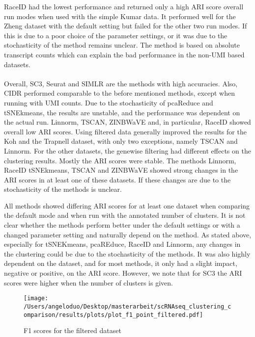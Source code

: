 \documentclass[12pt, a4paper]{article}\usepackage[]{graphicx}\usepackage[]{color}
\begin{document}
RaceID had the lowest performance and returned only a high ARI score overall run modes when used with the simple Kumar data. It performed well for the Zheng dataset with the default setting but failed for the other two run modes. If this is due to a poor choice of the parameter settings, or it was due to the stochasticity of the method remains unclear. The method is based on absolute transcript counts which can explain the bad performance in the non-UMI based datasets.
\paragraph{}

Overall, SC3, Seurat and SIMLR are the methods with high accuracies. Also, CIDR performed comparable to the before mentioned methods, except when running with UMI counts. Due to the stochasticity of pcaReduce and tSNEkmeans, the results are unstable, and the performance was dependent on the actual run. Linnorm, TSCAN, ZINBWaVE and, in particular, RaceID showed overall low ARI scores. 
Using filtered data generally improved the results for the Koh and the Trapnell dataset, with only two exceptions, namely TSCAN and Linnorm.
For the other datasets, the genewise filtering had different effects on the clustering results. Mostly the ARI scores were stable. The methods Linnorm, RaceID tSNEkmeans, TSCAN and ZINBWaVE showed strong changes in the ARI scores in at least one of these datasets. If these changes are due to the stochasticity of the methods is unclear.

All methods showed differing ARI scores for at least one dataset when comparing the default mode and when run with the annotated number of clusters. It is not clear whether the methods perform better under the default settings or with a changed parameter setting and naturally depend on the method. As stated above, especially for tSNEKmeans, pcaREduce, RaceID and Linnorm, any changes in the clustering could be due to the stochasticity of the methods. It was also highly dependent on the dataset, and for most methods, it only had a slight impact, negative or positive, on the ARI score. However, we note that for SC3 the ARI scores were higher when the number of clusters is given.

\begin{figure}[!h]
\centering
\texttt{[image: /Users/angeloduo/Desktop/masterarbeit/scRNAseq\_clustering\_comparison/results/plots/plot\_f1\_point\_filtered.pdf]}
\caption{F1 scores for the filtered  dataset }
\label{fig:f1pointplot}
\end{figure}
\end{document}
